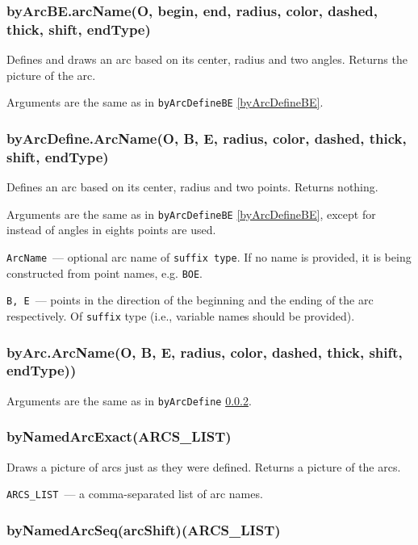 \subsubsection{byArcBE.arcName(O, begin, end, radius, color, dashed, thick, shift, endType)}\label{byArcBE}

	Defines and draws an arc based on its center, radius and two angles. Returns the picture of the arc.
	
	Arguments are the same as in \texttt{byArcDefineBE} \ref{byArcDefineBE}.

\subsubsection{byArcDefine.ArcName(O, B, E, radius, color, dashed, thick, shift, endType)}\label{byArcDefine}
	
	Defines an arc based on its center, radius and two points. Returns nothing.
	
	Arguments are the same as in \texttt{byArcDefineBE} \ref{byArcDefineBE}, except for instead of angles in eights points are used.
	
	\texttt{ArcName}~— optional arc name of \texttt{suffix type}. If no name is provided, it is being constructed from point names, e.g. \texttt{BOE}.
	
	\texttt{B, E}~— points in the direction of the beginning and the ending of the arc respectively. Of \texttt{suffix} type (i.e., variable names should be provided).

\subsubsection{byArc.ArcName(O, B, E, radius, color, dashed, thick, shift, endType))}\label{byArc}
	
	Arguments are the same as in \texttt{byArcDefine} \ref{byArcDefine}.
	
\subsubsection{byNamedArcExact(ARCS\_LIST)}\label{byNamedArcExact}
	Draws a picture of arcs just as they were defined. Returns a picture of the arcs.
	
	\texttt{ARCS\_LIST}~— a comma-separated list of arc names.
	
\subsubsection{byNamedArcSeq(arcShift)(ARCS\_LIST)}\label{byNamedArcSeq}

